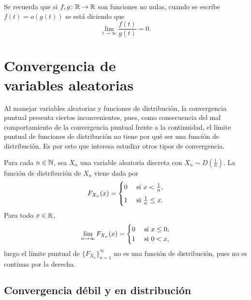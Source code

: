 \documentclass[a4paper, 11pt, extrafontsizes]{memoir}
\begin{document}
Se recuerda que si $f,g \colon \mathbb R \to \mathbb R$ son funciones no nulas, cuando se escribe $f(t) = o(g(t))$ se está diciendo que \[\lim_{t \to \infty} \frac{f(t)}{g(t)} = 0.\]

\chapter[Convergencia de variables aleatorias]{Convergencia de \\[-10pt] variables aleatorias}


Al manejar variables aleatorias y funciones de distribución, la convergencia puntual presenta ciertos inconvenientes, pues, como consecuencia del mal comportamiento de la convergencia puntual frente a la continuidad, el límite puntual de funciones de distribución no tiene por qué ser una función de distribución. Es por esto que interesa estudiar otros tipos de convergencia.

\begin{example}
    Para cada $n \in \mathbb N$, sea $X_n$ una variable aleatoria discreta con $X_n \sim D(\frac{1}{n})$. La función de distribución de $X_n$ viene dada por
    \[F_{X_n}(x) = \begin{cases}
        0 & $ si $ x < \frac{1}{n}, \\[5pt]
        1 & $ si $ \frac{1}{n} \leq x.
    \end{cases}\]
    Para todo $x \in \mathbb R$,
    \[\lim_{n \to \infty}F_{X_n}(x) = \begin{cases}
        0 & $ si $ x \leq 0, \\
        1 & $ si $ 0 < x,
    \end{cases}\]
    luego el límite puntual de $\{F_{X_n}\}_{n=1}^\infty$ no es una función de distribución, pues no es continua por la derecha.
\end{example}

\section{Convergencia débil y en distribución}
\end{document}
